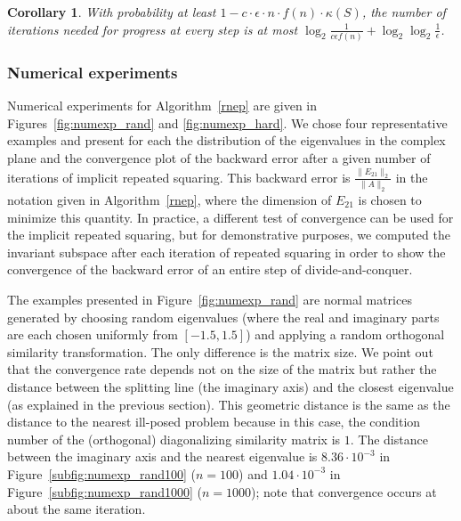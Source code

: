\documentclass{article}
\newtheorem{corollary}[theorem]{Corollary}
\theoremstyle{definition}
\begin{document}
\begin{corollary} \label{d3}
With probability at least $1 - c \cdot \epsilon \cdot n \cdot f(n) \cdot \kappa(S)$, the number of iterations needed for progress at every step is at most $ \log_2 \frac{1}{c \epsilon f(n)} + \log_2 \log_2 \frac{1}{\epsilon}$.
\end{corollary}

\subsubsection{Numerical experiments}
\label{sec:NumExp}

Numerical experiments for Algorithm~\ref{rnep} are given in Figures~\ref{fig:numexp_rand} and \ref{fig:numexp_hard}.  We chose four representative examples and present for each the distribution of the eigenvalues in the complex plane and the convergence plot of the backward error after a given number of iterations of implicit repeated squaring.  This backward error is $\frac{\|E_{21}\|_2}{\|A\|_2}$ in the notation given in Algorithm~\ref{rnep}, where the dimension of $E_{21}$ is chosen to minimize this quantity.  In practice, a different test of convergence can be used for the implicit repeated squaring, but for demonstrative purposes, we computed the invariant subspace after each iteration of repeated squaring in order to show the convergence of the backward error of an entire step of divide-and-conquer.

The examples presented in Figure~\ref{fig:numexp_rand} are normal matrices generated by choosing random eigenvalues (where the real and imaginary parts are each chosen uniformly from $[-1.5, 1.5]$) and applying a random orthogonal similarity transformation. The only difference is the matrix size.  We point out that the convergence rate depends not on the size of the matrix but rather the distance between the splitting line (the imaginary axis) and the closest eigenvalue (as explained in the previous section).  This geometric distance is the same as the distance to the nearest ill-posed problem because in this case, the condition number of the (orthogonal) diagonalizing similarity matrix is $1$.  The distance between the imaginary axis and the nearest eigenvalue is $8.36 \cdot 10^{-3}$ in Figure~\ref{subfig:numexp_rand100} ($n=100$) and $1.04 \cdot 10^{-3}$ in Figure~\ref{subfig:numexp_rand1000} ($n=1000$); note that convergence occurs at about the same iteration.
\end{document}
